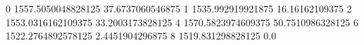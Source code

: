 0 1557.5050048828125 37.6737060546875
1 1535.992919921875 16.16162109375
2 1553.0316162109375 33.2003173828125
4 1570.5823974609375 50.7510986328125
6 1522.2764892578125 2.4451904296875
8 1519.831298828125 0.0
